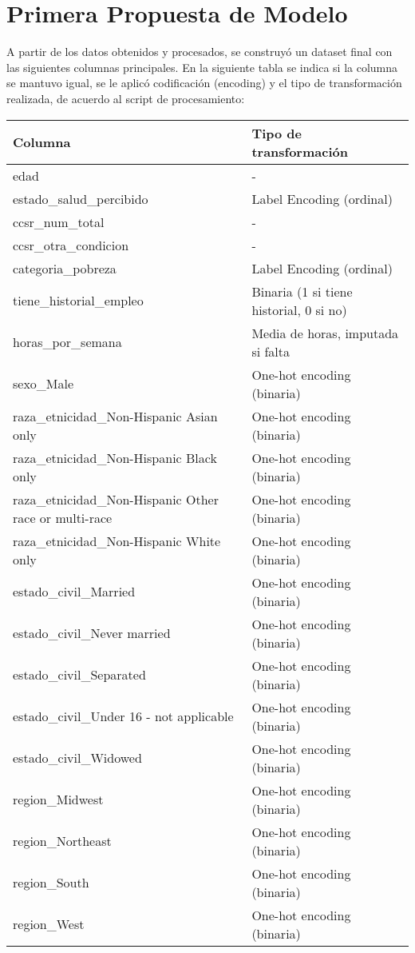 \documentclass[12pt]{article}
\begin{document}
\section{Primera Propuesta de Modelo}
A partir de los datos obtenidos y procesados, se construyó un dataset final con las siguientes columnas principales. En la siguiente tabla se indica si la columna se mantuvo igual, se le aplicó codificación (encoding) y el tipo de transformación realizada, de acuerdo al script de procesamiento:

\begin{longtable}{|l|l|}
\hline
\textbf{Columna} & \textbf{Tipo de transformación} \\
\hline
edad & - \\
estado\_salud\_percibido & Label Encoding (ordinal) \\
ccsr\_num\_total & - \\
ccsr\_otra\_condicion & - \\
categoria\_pobreza & Label Encoding (ordinal) \\
tiene\_historial\_empleo & Binaria (1 si tiene historial, 0 si no) \\
horas\_por\_semana & Media de horas, imputada si falta \\
sexo\_Male & One-hot encoding (binaria) \\
raza\_etnicidad\_Non-Hispanic Asian only & One-hot encoding (binaria) \\
raza\_etnicidad\_Non-Hispanic Black only & One-hot encoding (binaria) \\
raza\_etnicidad\_Non-Hispanic Other race or multi-race & One-hot encoding (binaria) \\
raza\_etnicidad\_Non-Hispanic White only & One-hot encoding (binaria) \\
estado\_civil\_Married & One-hot encoding (binaria) \\
estado\_civil\_Never married & One-hot encoding (binaria) \\
estado\_civil\_Separated & One-hot encoding (binaria) \\
estado\_civil\_Under 16 - not applicable & One-hot encoding (binaria) \\
estado\_civil\_Widowed & One-hot encoding (binaria) \\
region\_Midwest & One-hot encoding (binaria) \\
region\_Northeast & One-hot encoding (binaria) \\
region\_South & One-hot encoding (binaria) \\
region\_West & One-hot encoding (binaria) \\

\end{longtable}
\end{document}
